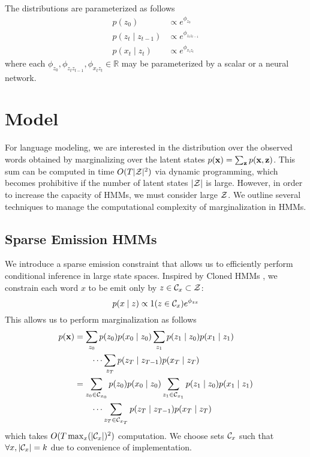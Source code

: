 \documentclass[11pt,a4paper]{article}
\begin{document}
The distributions are parameterized as follows
\begin{equation}
\label{param}
\begin{aligned}
p(z_0) &\propto e^{\phi_{z_0}}\\
p(z_t \mid z_{t-1}) &\propto e^{\phi_{z_tz_{t-1}}}\\
p(x_t \mid z_t) &\propto e^{\phi_{x_tz_t}}
\end{aligned}
\end{equation}
where each $\phi_{z_0},\phi_{z_tz_{t-1}},\phi_{x_tz_t} \in \mathbb{R}$
may be parameterized by a scalar or a neural network.

\section{Model}
For language modeling, we are interested in the distribution over the observed words
obtained by marginalizing over the latent states $p(\mathbf{x}) = \sum_{\mathbf{z}}p(\mathbf{x},\mathbf{z})$.
This sum can be computed in time $O(T|\mathcal{Z}|^2)$ via dynamic programming,
which becomes prohibitive if the number of latent states $|\mathcal{Z}|$ is large.
However, in order to increase the capacity of HMMs, we must consider large $\mathcal{Z}$.
We outline several techniques to manage the computational complexity of marginalization in HMMs.  

\subsection{Sparse Emission HMMs}
We introduce a sparse emission constraint that allows us to
efficiently perform conditional inference in large state spaces.
Inspired by Cloned HMMs \citep{dedieu2019learning},
we constrain each word $x$ to be emit only by $z \in \mathcal{C}_x \subset \mathcal{Z}$:
\begin{equation}
\label{eqn:sparse_emission}
p(x \mid z) \propto 1(z \in \mathcal{C}_x)e^{\phi_{zx}}
\end{equation}
This allows us to perform marginalization as follows
\begin{equation}
\label{eqn:sparse_marginalization}
\begin{aligned}
p(\mathbf{x}) &= \sum_{z_0} p(z_0)p(x_0 \mid z_0)
    \sum_{z_1}p(z_1\mid z_0)p(x_1 \mid z_1)\\
    &\qquad\cdots
    \sum_{z_T}p(z_T \mid z_{T-1})p(x_T \mid z_T)\\
&= \sum_{z_0 \in \mathcal{C}_{x_0}} p(z_0)p(x_0 \mid z_0)
    \sum_{z_1 \in \mathcal{C}_{x_1}} p(z_1\mid z_0)p(x_1 \mid z_1)\\
    &\qquad\cdots
    \sum_{z_T \in \mathcal{C}_{x_T}} p(z_T \mid z_{T-1})p(x_T \mid z_T)
\end{aligned}
\end{equation}
which takes $O(T \max_x(|\mathcal{C}_x|)^2)$ computation.
We choose sets $\mathcal{C}_x$ such that $\forall x, |\mathcal{C}_x| = k$
due to convenience of implementation.
\end{document}
